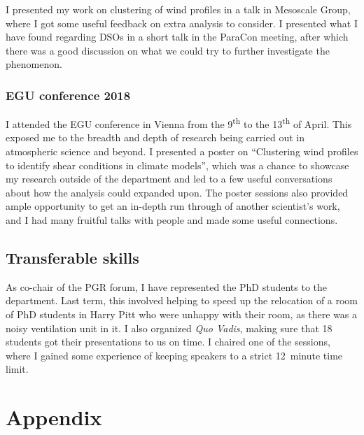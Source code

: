 \documentclass[11pt,a4paper]{article}
\newcommand{\ts}{\textsuperscript}
\begin{document}
I presented my work on clustering of wind profiles in a talk in Mesoscale Group, where I got some useful feedback on extra analysis to consider.  I presented what I have found regarding DSOs in a short talk in the ParaCon meeting, after which there was a good discussion on what we could try to further investigate the phenomenon.

\subsubsection{EGU conference 2018}

I attended the EGU conference in Vienna from the 9\ts{th} to the 13\ts{th} of April. This exposed me to the breadth and depth of research being carried out in atmospheric science and beyond. 
I presented a poster on ``Clustering wind profiles to identify shear conditions in climate models'', which was a chance to showcase my research outside of the department and led to a few useful conversations about how the analysis could expanded upon. The poster sessions also provided ample opportunity to get an in-depth run through of another scientist's work, and I had many fruitful talks with people and made some useful connections.

\subsection{Transferable skills}
\label{sec:Transferable skills}

As co-chair of the PGR forum, I have represented the PhD students to the department. Last term, this involved helping to speed up the relocation of a room of PhD students in Harry Pitt who were unhappy with their room, as there was a noisy ventilation unit in it. I also organized \textit{Quo Vadis}, making sure that 18 students got their presentations to us on time. I chaired one of the sessions, where I gained some experience of keeping speakers to a strict \SI{12}{minute} time limit.

\printbibliography[title={References}]

\newpage
\section*{Appendix}

\renewcommand\thefigure{A.\arabic{figure}}
\setcounter{figure}{0}    
\end{document}
